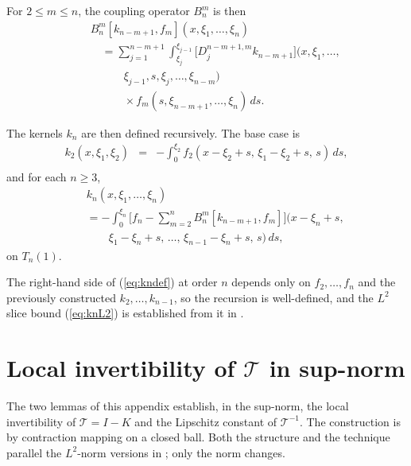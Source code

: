 \documentclass[amsthm]{autart}
\theoremstyle{plain}
\theoremstyle{definition}
\newcommand{\Tcal}{\mathcal{T}}
\newcommand{\Ltwo}{L^2}
\begin{document}
For $2 \le m \le n$, the coupling operator $B_n^m$ is then
\begin{eqnarray}
&& B_n^m[k_{n-m+1}, f_m](x, \xi_1, \ldots, \xi_n) \nonumber \\
&& \quad = \sum_{j=1}^{n-m+1} \int_{\xi_j}^{\xi_{j-1}} \bigl[D_j^{n-m+1,m} k_{n-m+1}\bigr]\bigl(x, \xi_1, \ldots, \nonumber \\
&& \quad\quad\quad \xi_{j-1}, s, \xi_j, \ldots, \xi_{n-m}\bigr) \nonumber \\
&& \quad\quad\quad \times f_m(s, \xi_{n-m+1}, \ldots, \xi_n)\, ds.
\label{eq:Bdef}
\end{eqnarray}

The kernels $k_n$ are then defined recursively. The base case is
\begin{eqnarray}
k_2(x, \xi_1, \xi_2) &=& -\int_0^{\xi_2} f_2(x - \xi_2 + s,\, \xi_1 - \xi_2 + s,\, s)\, ds, \nonumber \\
&&
\label{eq:k2def}
\end{eqnarray}
and for each $n \ge 3$,
\begin{eqnarray}
&& k_n(x, \xi_1, \ldots, \xi_n) \nonumber \\
&& = -\int_0^{\xi_n} \biggl[f_n - \sum_{m=2}^{n} B_n^m[k_{n-m+1}, f_m]\biggr]\bigl(x - \xi_n + s, \nonumber \\
&& \quad\quad \xi_1 - \xi_n + s,\, \ldots,\, \xi_{n-1} - \xi_n + s,\, s\bigr)\, ds,
\label{eq:kndef}
\end{eqnarray}
on $T_n(1)$.

The right-hand side of (\ref{eq:kndef}) at order $n$ depends only on $f_2, \ldots, f_n$ and the previously constructed $k_2, \ldots, k_{n-1}$, so the recursion is well-defined, and the $\Ltwo$ slice bound (\ref{eq:knL2}) is established from it in \cite{krstic2026feedbacklinearizationhyperbolicpdes}.

\section{Local invertibility of $\Tcal$ in sup-norm}\label{app:Tinv}

The two lemmas of this appendix establish, in the sup-norm, the local invertibility of $\Tcal = I - K$ and the Lipschitz constant of $\Tcal^{-1}$. The construction is by contraction mapping on a closed ball. Both the structure and the technique parallel the $\Ltwo$-norm versions in \cite{krstic2026feedbacklinearizationhyperbolicpdes}; only the norm changes.
\end{document}
